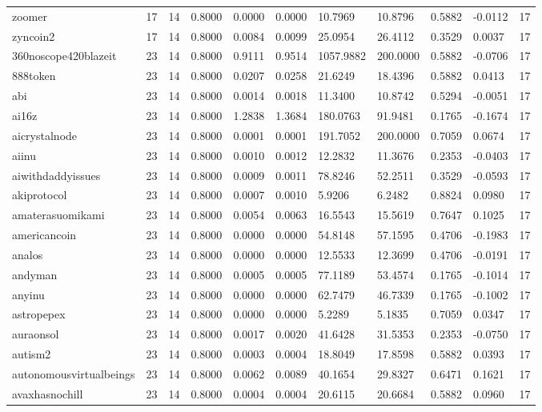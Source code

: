 \begin{table}[htbp]
\begin{tabular}{lllllllllll}
zoomer & 17 & 14 & 0.8000 & 0.0000 & 0.0000 & 10.7969 & 10.8796 & 0.5882 & -0.0112 & 17 \\
zyncoin2 & 17 & 14 & 0.8000 & 0.0084 & 0.0099 & 25.0954 & 26.4112 & 0.3529 & 0.0037 & 17 \\
360noscope420blazeit & 23 & 14 & 0.8000 & 0.9111 & 0.9514 & 1057.9882 & 200.0000 & 0.5882 & -0.0706 & 17 \\
888token & 23 & 14 & 0.8000 & 0.0207 & 0.0258 & 21.6249 & 18.4396 & 0.5882 & 0.0413 & 17 \\
abi & 23 & 14 & 0.8000 & 0.0014 & 0.0018 & 11.3400 & 10.8742 & 0.5294 & -0.0051 & 17 \\
ai16z & 23 & 14 & 0.8000 & 1.2838 & 1.3684 & 180.0763 & 91.9481 & 0.1765 & -0.1674 & 17 \\
aicrystalnode & 23 & 14 & 0.8000 & 0.0001 & 0.0001 & 191.7052 & 200.0000 & 0.7059 & 0.0674 & 17 \\
aiinu & 23 & 14 & 0.8000 & 0.0010 & 0.0012 & 12.2832 & 11.3676 & 0.2353 & -0.0403 & 17 \\
aiwithdaddyissues & 23 & 14 & 0.8000 & 0.0009 & 0.0011 & 78.8246 & 52.2511 & 0.3529 & -0.0593 & 17 \\
akiprotocol & 23 & 14 & 0.8000 & 0.0007 & 0.0010 & 5.9206 & 6.2482 & 0.8824 & 0.0980 & 17 \\
amaterasuomikami & 23 & 14 & 0.8000 & 0.0054 & 0.0063 & 16.5543 & 15.5619 & 0.7647 & 0.1025 & 17 \\
americancoin & 23 & 14 & 0.8000 & 0.0000 & 0.0000 & 54.8148 & 57.1595 & 0.4706 & -0.1983 & 17 \\
analos & 23 & 14 & 0.8000 & 0.0000 & 0.0000 & 12.5533 & 12.3699 & 0.4706 & -0.0191 & 17 \\
andyman & 23 & 14 & 0.8000 & 0.0005 & 0.0005 & 77.1189 & 53.4574 & 0.1765 & -0.1014 & 17 \\
anyinu & 23 & 14 & 0.8000 & 0.0000 & 0.0000 & 62.7479 & 46.7339 & 0.1765 & -0.1002 & 17 \\
astropepex & 23 & 14 & 0.8000 & 0.0000 & 0.0000 & 5.2289 & 5.1835 & 0.7059 & 0.0347 & 17 \\
auraonsol & 23 & 14 & 0.8000 & 0.0017 & 0.0020 & 41.6428 & 31.5353 & 0.2353 & -0.0750 & 17 \\
autism2 & 23 & 14 & 0.8000 & 0.0003 & 0.0004 & 18.8049 & 17.8598 & 0.5882 & 0.0393 & 17 \\
autonomousvirtualbeings & 23 & 14 & 0.8000 & 0.0062 & 0.0089 & 40.1654 & 29.8327 & 0.6471 & 0.1621 & 17 \\
avaxhasnochill & 23 & 14 & 0.8000 & 0.0004 & 0.0004 & 20.6115 & 20.6684 & 0.5882 & 0.0960 & 17 \\

\end{tabular}
\end{table}
